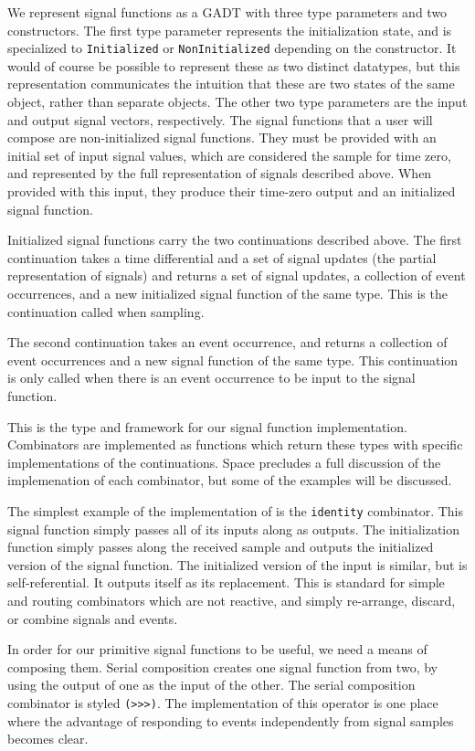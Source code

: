 We represent signal functions as a GADT with three type parameters and two 
constructors. The first type parameter represents the initialization state,
and is specialized to {\tt Initialized} or {\tt NonInitialized} depending on the
constructor. It would of course be possible to represent these as two distinct
datatypes, but this representation communicates the intuition that these are
two states of the same object, rather than separate objects. The other two type
parameters are the input and output signal vectors, respectively. The signal
functions that a user will compose are non-initialized signal functions.
They must be provided with an initial set of input signal values, which are considered
the sample for time zero, and represented by the full representation of signals
described above. When provided with this input, they produce their time-zero
output and an initialized signal function.

Initialized signal functions carry the two continuations described above.
The first continuation takes a time differential and a set of signal updates
(the partial representation of signals) and returns a set of signal updates, a
collection of event occurrences, and a new initialized signal function of the
same type. This is the continuation called when sampling.

The second continuation takes an event occurrence, and returns a collection of
event occurrences and a new signal function of the same type. This continuation
is only called when there is an event occurrence to be input to the signal
function.

This is the type and framework for our signal function implementation.
Combinators are implemented as functions which return these types with specific
implementations of the continuations. Space precludes a full discussion of the
implemenation of each combinator, but some of the examples will be discussed.

The simplest example of the implementation of is the {\tt identity} combinator.
This signal function
simply passes all of its inputs along as outputs. The initialization function
simply passes along the received sample and outputs the initialized version of
the signal function. The initialized version of the input is similar, but is
self-referential. It outputs itself as its replacement. This is standard for
simple and routing combinators which are not reactive, and simply re-arrange,
discard, or combine signals and events.

In order for our primitive signal functions to be useful, we need a means of
composing them. Serial composition creates one signal function from two, by
using the output of one as the input of the other. The serial composition
combinator is styled {\tt (>>>)}. The implementation of this operator is one
place where the advantage of responding to events independently from signal
samples becomes clear. 

